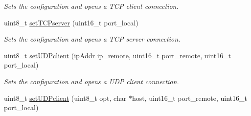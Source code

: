 \begin{DoxyCompactItemize}
\begin{DoxyCompactList}\small\item\em Sets the configuration and opens a T\+CP client connection. \end{DoxyCompactList}\item 
uint8\+\_\+t \hyperlink{class_wasp_w_i_f_i_a147034d95622ff4a96591e82c899e0c5}{set\+T\+C\+Pserver} (uint16\+\_\+t port\+\_\+local)
\begin{DoxyCompactList}\small\item\em Sets the configuration and opens a T\+CP server connection. \end{DoxyCompactList}\item 
uint8\+\_\+t \hyperlink{class_wasp_w_i_f_i_a1415970763b9ca9ae0ad4446e6fc19fe}{set\+U\+D\+Pclient} (ip\+Addr ip\+\_\+remote, uint16\+\_\+t port\+\_\+remote, uint16\+\_\+t port\+\_\+local)
\begin{DoxyCompactList}\small\item\em Sets the configuration and opens a U\+DP client connection. \end{DoxyCompactList}\item 
uint8\+\_\+t \hyperlink{class_wasp_w_i_f_i_af55bd4245376acb4f48588096c96a45c}{set\+U\+D\+Pclient} (uint8\+\_\+t opt, char $\ast$host, uint16\+\_\+t port\+\_\+remote, uint16\+\_\+t port\+\_\+local)\hypertarget{class_wasp_w_i_f_i_af55bd4245376acb4f48588096c96a45c}{}\label{class_wasp_w_i_f_i_af55bd4245376acb4f48588096c96a45c}


\end{DoxyCompactItemize}
